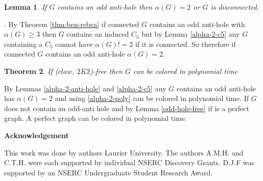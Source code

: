 \documentclass[12pt]{article}
\newtheorem{Theorem}{Theorem}[section]
\newtheorem{Lemma}[Theorem]{Lemma}
\def\CK{($claw$, $2K2$)}
\begin{document}
\begin{Lemma}\label{lem:alpha-2-anti-hole}
If $G$ contains an odd anti-hole then $\alpha(G) =2$ or $G$ is disconnected.
\end{Lemma}
.
By Theorem \ref{thm:ben-rebea} if connected $G$ contains an odd anti-hole with $\alpha(G) \geq 3$ then $G$ contains an induced $C_5$ but by Lemma \ref{alpha-2-c5} any $G$ containing a $C_5$ cannot have $\alpha(G) != 2$ if it is connected. So therefore if connected $G$ contains an odd anti-hole $\alpha(G) = 2$.

\begin{Theorem}\label{thm:poly-colorable}
If {\CK}-free then $G$ can be colored in polynomial time
\end{Theorem}

By Lemmas \ref{alpha-2-anti-hole} and \ref{alpha-2-c5} any $G$ contains an odd anti-hole has $\alpha(G) = 2$ and using \ref{alpha-2-poly} can be colored in polynomial time. If $G$ does not contain an odd-anti hole and by Lemma \ref{odd-hole-free} if is a perfect graph. A perfect graph can be colored in polynomial time.

\begin{center}
{\bf Acknowledgement}
\end{center}
This work was done by authors  Laurier University. The authors A.M.H. and C.T.H. were each supported by individual NSERC Discovery Grants. D.J.F was supported by an NSERC Undergraduate Student Research Award.


\clearpage
\begin{thebibliography}{99}

\end{thebibliography}
\end{document}

